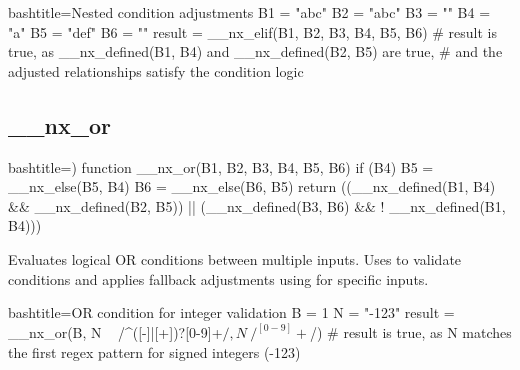 \begin{NexCodeBox}{bash}{title={Nested condition adjustments}}
	B1 = "abc"
	B2 = "abc"
	B3 = ""
	B4 = "a"
	B5 = "def"
	B6 = ""
	result = __nx_elif(B1, B2, B3, B4, B5, B6)
	# result is true, as __nx_defined(B1, B4) and __nx_defined(B2, B5) are true,
	# and the adjusted relationships satisfy the condition logic
\end{NexCodeBox}

\newpage
\subsection{__nx_or}
\label{__nx_or}
\begin{NexCodeBox}{bash}{title={)}}
function __nx_or(B1, B2, B3, B4, B5, B6) {
	if (B4) {
		B5 = __nx_else(B5, B4)
		B6 = __nx_else(B6, B5)
	}
	return ((__nx_defined(B1, B4) && __nx_defined(B2, B5)) || (__nx_defined(B3, B6) && ! __nx_defined(B1, B4)))
}
\end{NexCodeBox}

\begin{NexMainBox}
	\begin{NexMainBox}
		Evaluates logical OR conditions between multiple inputs. Uses  to validate conditions and applies fallback adjustments using  for specific inputs.
	\end{NexMainBox}
	\begin{NexMainBox}
		\begin{NexListDark}
		\end{NexListDark}
	\end{NexMainBox}
\end{NexMainBox}

\begin{NexCodeBox}{bash}{title={OR condition for integer validation}}
	B = 1
	N = "-123"
	result = __nx_or(B, N ~ /^([-]|[+])?[0-9]+$/, N ~ /^[0-9]+$/)
	# result is true, as N matches the first regex pattern for signed integers (-123)
\end{NexCodeBox}

